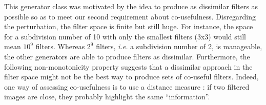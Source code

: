 \documentclass[a4paper]{report}
\begin{document}
			\par
			This generator class was motivated by the idea to produce as dissimilar filters as possible so as to meet our second requirement about co-usefulness. Disregarding the perturbation, the filter space is finite but still huge. For instance, the space for a subdivision number of 10 with only the smallest filters (3x3) would still mean $10^9$ filters.  Whereas $2^9$ filters, \textit{i.e.} a subdivision number of 2, is manageable, the other generators are able to produce filters as dissimilar. Furthermore, the following non-monotonicity property suggests that a dissimilar approach in the filter space might not be the best way to produce sets of co-useful filters. Indeed, one way of assessing co-usefulness is to use a distance measure : if two filtered images are close, they probably highlight the same ``information''.
			
\end{document}
